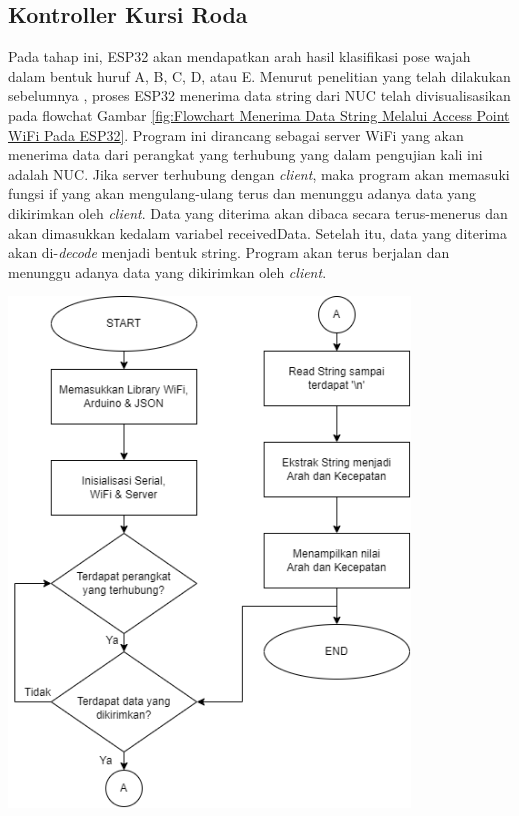 \subsection{Kontroller Kursi Roda}
Pada tahap ini, ESP32 akan mendapatkan arah hasil klasifikasi pose wajah dalam bentuk huruf A, B, C, D, atau E. Menurut penelitian yang telah dilakukan sebelumnya \parencite{ekatama2024perancangan}, proses ESP32 menerima data string dari NUC telah divisualisasikan pada flowchat Gambar \ref{fig:Flowchart Menerima Data String Melalui Access Point WiFi Pada ESP32}. Program ini dirancang sebagai server WiFi yang akan menerima data dari perangkat yang terhubung yang dalam pengujian kali ini adalah NUC. Jika server terhubung dengan \emph{client}, maka program akan memasuki fungsi if yang akan mengulang-ulang terus dan menunggu adanya data yang dikirimkan oleh \emph{client}. Data yang diterima akan dibaca secara terus-menerus dan akan dimasukkan kedalam variabel receivedData. Setelah itu, data yang diterima akan di-\emph{decode} menjadi bentuk string. Program akan terus berjalan dan menunggu adanya data yang dikirimkan oleh \emph{client}.

\begin{center}
  \centering
  \includegraphics[width=0.8\textwidth]{gambar/4. Menerima String WiFi.png}
  \label{fig:Flowchart Menerima Data String Melalui Access Point WiFi Pada ESP32}
\end{center}


